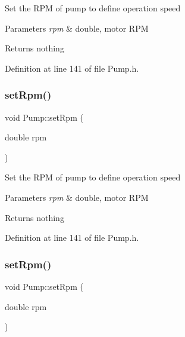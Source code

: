 Set the R\+PM of pump to define operation speed


\begin{DoxyParams}{Parameters}
{\em rpm} & double, motor R\+PM\\
\hline
\end{DoxyParams}
\begin{DoxyReturn}{Returns}
nothing 
\end{DoxyReturn}


Definition at line 141 of file Pump.\+h.

\mbox{\label{class_pump_a7478d85c3b89cda275b039673603a785}} 
\subsubsection{\texorpdfstring{set\+Rpm()}{setRpm()}\hspace{0.1cm}{\footnotesize\ttfamily [2/3]}}
{\footnotesize\ttfamily void Pump\+::set\+Rpm (\begin{DoxyParamCaption}\item[{double}]{rpm }\end{DoxyParamCaption})\hspace{0.3cm}{\ttfamily [inline]}}

Set the R\+PM of pump to define operation speed


\begin{DoxyParams}{Parameters}
{\em rpm} & double, motor R\+PM\\
\hline
\end{DoxyParams}
\begin{DoxyReturn}{Returns}
nothing 
\end{DoxyReturn}


Definition at line 141 of file Pump.\+h.

\mbox{\label{class_pump_a7478d85c3b89cda275b039673603a785}} 
\subsubsection{\texorpdfstring{set\+Rpm()}{setRpm()}\hspace{0.1cm}{\footnotesize\ttfamily [3/3]}}
{\footnotesize\ttfamily void Pump\+::set\+Rpm (\begin{DoxyParamCaption}\item[{double}]{rpm }\end{DoxyParamCaption})\hspace{0.3cm}{\ttfamily [inline]}}

